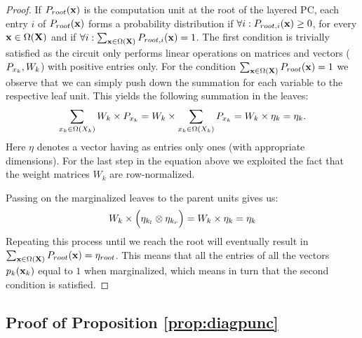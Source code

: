 \begin{proof}
	If $P_{root} (\mathbf{x})$ is the computation unit at the root of the layered PC, each entry $i$ of $P_{root} (\mathbf{x})$ forms a probability distribution if $\forall i: P_{root, i}(\mathbf{x})\geq 0$, for every $\mathbf{x} \in \Omega(\mathbf{X})$ and if $\forall i: \sum_{\mathbf{x} \in \Omega(\mathbf{X})} P_{root, i}(\mathbf{x})=1$. The first condition is trivially satisfied as the circuit only performs linear operations on matrices and vectors ($P_{x_k}, W_k$) with positive entries only.
	For the condition $\sum_{\mathbf{x} \in \Omega(\mathbf{X})} P_{root}(\mathbf{x})=1$ we observe that we can simply push down the summation for each variable to the respective leaf unit. This yields the following summation in the leaves:
	\begin{align}
		\sum_{x_k \in \Omega(X_k)} W_k \times P_{x_k}
		=
		W_k \times \sum_{x_k \in \Omega(X_k)} P_{x_k}
		=
		W_k \times \eta_{k} = \eta_{k}.
	\end{align}
	Here $\eta$ denotes a vector having as entries only ones (with appropriate dimensions). For the last step in the equation above we exploited the fact that the weight matrices $W_k$ are row-normalized.

	Passing on the marginalized leaves to the parent units gives us:
	\begin{align}
		W_k \times \Bigl( \eta_{k_l} \otimes \eta_{k_r} \Bigr)
		=
		W_k \times \eta_{k}  =  \eta_k
	\end{align}
	Repeating this process until we reach the root will eventually result in $\sum_{\mathbf{x} \in \Omega(\mathbf{X})} P_{root}(\mathbf{x})=\eta_{root}$. This means that all the entries of all the vectors $p_k(\mathbf{x}_k)$ equal to $1$ when marginalized, which means in turn that the second condition is satisfied.
\end{proof}





\subsection{Proof of Proposition \ref{prop:diagpunc}}
\label{sec:proof:prop:diagpunc}


\propdiagpunc*


